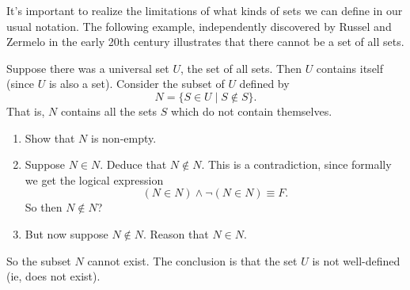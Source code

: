 It's important to realize the limitations of what kinds of sets we can define in our usual notation. The following example, independently discovered by Russel and Zermelo in the early 20th century illustrates that there cannot be a set of all sets. 

Suppose there was a universal set $U$, the set of all sets. Then $U$ contains itself (since $U$ is also a set).  Consider the subset of $U$ defined by
\[N = \{S \in U \mid S \not\in S\}.\] That is, $N$ contains all the sets $S$ which do not contain themselves.

\begin{enumerate}
    \item Show that $N$ is non-empty.
    \item Suppose $N \in N$. Deduce that $N \not\in N$. This is a contradiction, since formally we get the logical expression
    \[(N \in N) \land \lnot(N \in N) \equiv F.\]
    So then $N \not\in N$?
    \item But now suppose $N \not\in N$. Reason that $N \in N$.
\end{enumerate}
So the subset $N$ cannot exist. The conclusion is that the set $U$ is not well-defined (ie, does not exist).